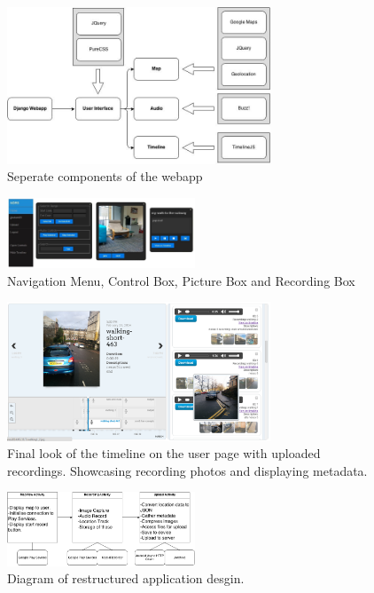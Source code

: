 \documentclass{l3proj}
\begin{document}
\newpage
\begin{figure}[ht!]
\centering
\includegraphics[angle=270, width=0.7\textwidth]{images/webapp-imp.jpg}
\caption{Seperate components of the webapp}
\end{figure}

\newpage
\begin{figure}[ht!]
\centering
\includegraphics[angle=270, width=0.5\textwidth]{images/ui-elements.jpg}
\caption{Navigation Menu, Control Box, Picture Box and Recording Box}
\end{figure}

\newpage
\begin{figure}[ht!]
\centering
\includegraphics[angle=270, width=0.7\textwidth]{images/timeline_final.png}
\caption{Final look of the timeline on the user page with uploaded recordings. Showcasing recording photos and displaying metadata.}
\end{figure}

\newpage
\begin{figure}[ht!]
\centering
\includegraphics[angle=270, width=0.5\textwidth]{images/android-app-structure.png}
\caption{Diagram of restructured application desgin.}
\end{figure}
\end{document}
